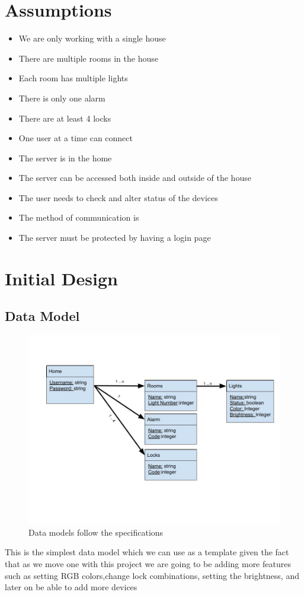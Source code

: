 \documentclass[11pt]{article}
\begin{document}
	\section*{Assumptions}
		\begin{itemize}
			\item We are only working with a single house
			\item There are multiple rooms in the house
			\item Each room has multiple lights
			\item There is only one alarm
			\item There are at least 4 locks
			\item One user at a time can connect
			\item The server is in the home
			\item The server can be accessed both inside and outside of the house
			\item The user needs to check and alter status of the devices
			\item The method of communication is
			\item The server must be protected by having a login page
		\end{itemize}
	\section*{Initial Design}
		\subsection*{Data Model}
			\begin{figure}[H]
				\centering
				\includegraphics[scale=0.5]{data_model}
				\caption{Data models follow the specifications}
				\label{fig:datamodel}
			\end{figure}
		This is the simplest data model which we can use as a template given the fact that as we move one with this project we are going to be adding more features such as setting RGB colors,change lock combinations, setting the brightness, and later on be able to add more devices
\end{document}
